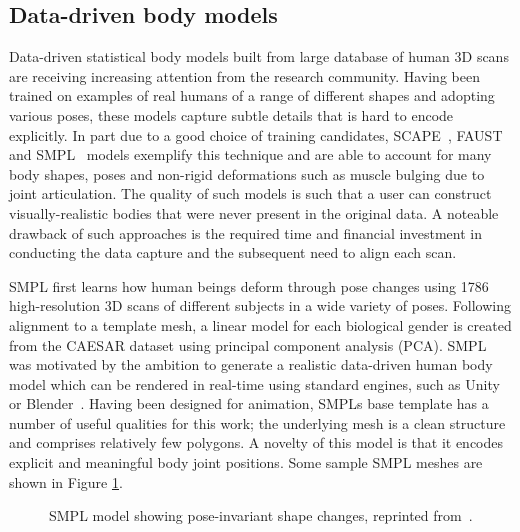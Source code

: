     \subsection{Data-driven body models}
        Data-driven statistical body models built from large database of human 3D scans are receiving increasing attention from the research community. Having been trained on examples of real humans of a range of different shapes and adopting various poses, these models capture subtle details that is hard to encode explicitly. In part due to a good choice of training candidates, SCAPE~\cite{anguelov05scape}, FAUST~\cite{bogo2014faust} and SMPL~\cite{loper15smpl} models exemplify this technique and are able to account for many body shapes, poses and non-rigid deformations such as muscle bulging due to joint articulation. The quality of such models is such that a user can construct visually-realistic bodies that were never present in the original data. A noteable drawback of such approaches is the required time and financial investment in conducting the data capture and the subsequent need to align each scan.

        SMPL first learns how human beings deform through pose changes using 1786 high-resolution 3D scans of different subjects in a wide variety of poses. Following alignment to a template mesh, a linear model for each biological gender is created from the CAESAR dataset \cite{robinette2002civilian} using principal component analysis (PCA). SMPL was motivated by the ambition to generate a realistic data-driven human body model which can be rendered in real-time using standard engines, such as Unity~\cite{unity2017} or Blender~\cite{blender2017}. Having been designed for animation, SMPLs base template has a number of useful qualities for this work; the underlying mesh is a clean structure and comprises relatively few polygons. A novelty of this model is that it encodes explicit and meaningful body joint positions. Some sample SMPL meshes are shown in Figure \ref{fig:smpl_model}.

        \begin{figure}[H] %
            \caption{SMPL model showing pose-invariant shape changes, reprinted from~\cite{loper15smpl}.}
            \label{fig:smpl_model}
        \end{figure}

